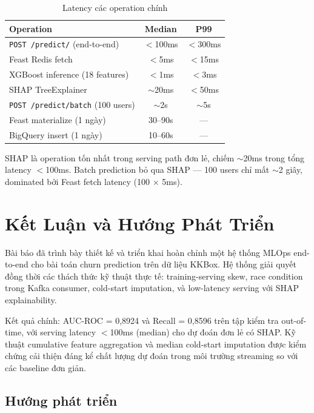 \documentclass[conference]{IEEEtran}
\begin{document}
\begin{table}[htbp]
\caption{Latency các operation chính}
\label{tab:latency}
\centering
\begin{tabular}{lcc}
\toprule
\textbf{Operation} & \textbf{Median} & \textbf{P99} \\
\midrule
\texttt{POST /predict/} (end-to-end)& $<$100ms & $<$300ms \\
Feast Redis fetch                   & $<$5ms   & $<$15ms  \\
XGBoost inference (18 features)     & $<$1ms   & $<$3ms   \\
SHAP TreeExplainer                  & $\sim$20ms & $<$50ms \\
\texttt{POST /predict/batch} (100 users) & $\sim$2s & $\sim$5s \\
Feast materialize (1 ngày)          & 30–90s   & — \\
BigQuery insert (1 ngày)            & 10–60s   & — \\
\bottomrule
\end{tabular}
\end{table}

SHAP là operation tốn nhất trong serving path đơn lẻ, chiếm $\sim$20ms trong
tổng latency $<$100ms. Batch prediction bỏ qua SHAP — 100 users chỉ mất
$\sim$2 giây, dominated bởi Feast fetch latency (100 × 5ms).

\section{Kết Luận và Hướng Phát Triển}
\label{sec:conclusion}

Bài báo đã trình bày thiết kế và triển khai hoàn chỉnh một hệ thống MLOps
end-to-end cho bài toán churn prediction trên dữ liệu KKBox. Hệ thống giải
quyết đồng thời các thách thức kỹ thuật thực tế: training-serving skew, race
condition trong Kafka consumer, cold-start imputation, và low-latency serving
với SHAP explainability.

Kết quả chính: AUC-ROC = 0,8924 và Recall = 0,8596 trên tập kiểm tra
out-of-time, với serving latency $<$100ms (median) cho dự đoán đơn lẻ có
SHAP. Kỹ thuật cumulative feature aggregation và median cold-start imputation
được kiểm chứng cải thiện đáng kể chất lượng dự đoán trong môi trường
streaming so với các baseline đơn giản.

\subsection{Hướng phát triển}
\end{document}
